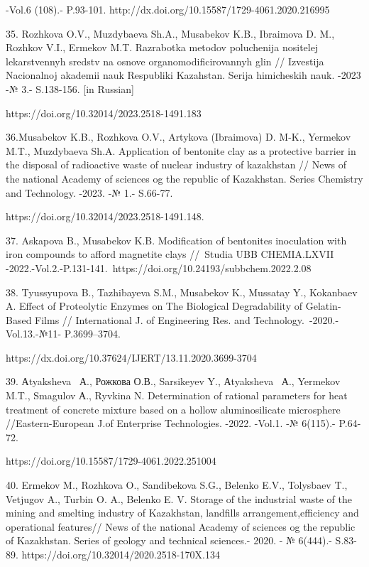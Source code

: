 \begin{noparindent}
-Vol.6 (108).- P.93-101.
http://dx.doi.org/10.15587/1729-4061.2020.216995

35. Rozhkova O.V., Muzdybaeva Sh.A., Musabekov K.B., Ibraimova D. M.,
Rozhkov V.I., Ermekov M.T. Razrabotka metodov poluchenija nositelej
lekarstvennyh sredstv na osnove organomodificirovannyh glin // Izvestija
Nacional\textquotesingle noj akademii nauk Respubliki Kazahstan. Serija
himicheskih nauk. -2023 -№ 3.- S.138-156. {[}in Russian{]}

https://doi.org/10.32014/2023.2518-1491.183

36.Musabekov K.B., Rozhkova O.V., Artykova (Ibraimova) D. M-K., Yermekov
M.T., Muzdybaeva Sh.A. Application of bentonite clay as a protective
barrier in the disposal of radioactive waste of nuclear industry of
kazakhstan // News of the national Academy of sciences og the republic
of Kazakhstan. Series Chemistry and Technology. -2023. -№ 1.- S.66-77.

https://doi.org/10.32014/2023.2518-1491.148.

37. Askapova B., Musabekov K.B. Modification of bentonites inoculation
with iron compounds to afford magnetite clays //~Studia UBB CHEMIA.LXVII
-2022.-Vol.2.-P.131-141.~https://doi.org/10.24193/subbchem.2022.2.08

38. Tyussyupova B., Tazhibayeva S.M., Musabekov K., Mussatay Y.,
Kokanbaev A. Effect of Proteolytic Enzymes on The Biological
Degradability of Gelatin-Based Films // International J. of Engineering
Res. and Technology.~-2020.-Vol.13.-№11- P.3699--3704.

https://dx.doi.org/10.37624/IJERT/13.11.2020.3699-3704

39. Аtyaksheva~ А., Рожкова О.В., Sarsikeyev Y., Аtyaksheva~ А.,
Yermekov M.T., Smagulov А., Ryvkina N. Determination of rational
parameters for heat treatment of concrete mixture based on a hollow
aluminosilicate microsphere //Eastern-European J.of Enterprise
Technologies. -2022. -Vol.1. -№ 6(115).- P.64-72.

https://doi.org/10.15587/1729-4061.2022.251004

40. Ermekov M., Rozhkova O., Sandibekova S.G., Belenko E.V., Tolysbaev
T., Vetjugov A., Turbin O. A., Belenko E. V. Storage of the industrial
waste of the mining and smelting industry of Kazakhstan, landfills
arrangement,efficiency and operational features// News of the national
Academy of sciences og the republic of Kazakhstan. Series of geology and
technical sciences.- 2020. - № 6(444).- S.83-89.
https://doi.org/10.32014/2020.2518-170X.134


\end{noparindent}
